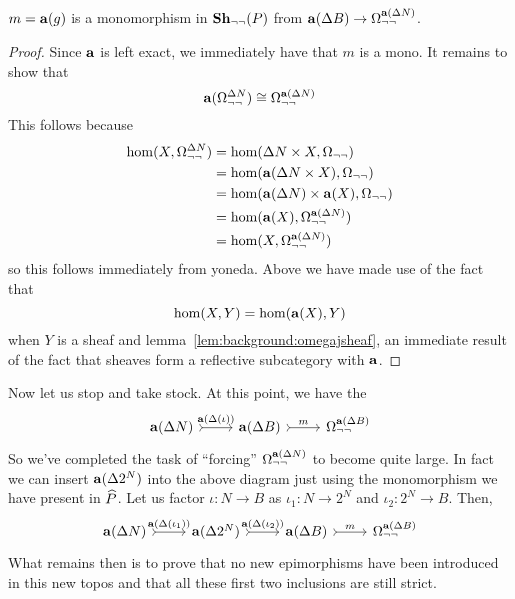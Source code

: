 \begin{cor}
  $m = \sheafify(g)$ is a monomorphism in $\sheaves[\neg\neg]{P}$ from
  $\sheafify(\Delta B) \to \Omega_{\neg\neg}^{\sheafify(\Delta N)}$.
\end{cor}
\begin{proof}
  Since $\sheafify$ is left exact, we immediately have that $m$ is a
  mono. It remains to show that
  \[
    \sheafify(\Omega_{\neg\neg}^{\Delta N}) \cong
    \Omega_{\neg\neg}^{\sheafify(\Delta N)}
  \]
  This follows because
  \begin{align*}
    \hom(X, \Omega_{\neg\neg}^{\Delta N}) &=
        \hom(\Delta N \times X, \Omega_{\neg\neg})\\
     &= \hom(\sheafify(\Delta N \times X), \Omega_{\neg\neg})\\
     &= \hom(\sheafify(\Delta N) \times \sheafify(X), \Omega_{\neg\neg})\\
     &= \hom(\sheafify(X), \Omega_{\neg\neg}^{\sheafify(\Delta N) })\\
     &= \hom(X, \Omega_{\neg\neg}^{\sheafify(\Delta N) })\\
  \end{align*}
  so this follows immediately from yoneda. Above we have made use of
  the fact that
  \[
    \hom(X, Y) = \hom(\sheafify(X), Y)
  \]
  when $Y$ is a sheaf and lemma~\ref{lem:background:omegajsheaf}, an
  immediate result of the fact that sheaves form a reflective
  subcategory with $\sheafify$.
\end{proof}

Now let us stop and take stock. At this point, we have the
\[
  \begin{tikzcd}
    \sheafify(\Delta N) \ar[r, rightarrowtail, "\sheafify(\Delta(\iota))"] &
    \sheafify(\Delta B)  \ar[r, rightarrowtail, "m"] &
    \Omega_{\neg\neg}^{\sheafify(\Delta B)}
  \end{tikzcd}
\]
So we've completed the task of ``forcing''
$\Omega_{\neg\neg}^{\sheafify(\Delta N)}$ to become quite large. In
fact we can insert $\sheafify(\Delta 2^N)$ into the above diagram
just using the monomorphism we have present in $\presheaf{P}$. Let us
factor $\iota : N \to B$ as $\iota_1 : N \to 2^N$ and
$\iota_2 : 2^N \to B$. Then,
\[
  \begin{tikzcd}
    \sheafify(\Delta N) \ar[r, rightarrowtail, "\sheafify(\Delta(\iota_1))"] &
    \sheafify(\Delta 2^N) \ar[r, rightarrowtail, "\sheafify(\Delta(\iota_2))"] &
    \sheafify(\Delta B) \ar[r, rightarrowtail, "m"] &
    \Omega_{\neg\neg}^{\sheafify(\Delta B)}
  \end{tikzcd}
\]
What remains then is to prove that no new epimorphisms have been
introduced in this new topos and that all these first two inclusions
are still strict.
